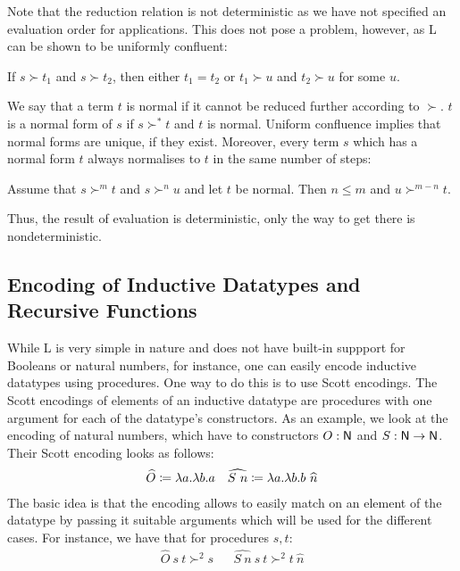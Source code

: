 Note that the reduction relation is not deterministic as we have not specified an evaluation order for applications. This does not pose a problem, however, as L can be shown to be uniformly confluent: 
\begin{fact}
  If $s \succ t_1$ and $s \succ t_2$, then either $t_1 = t_2$ or $t_1 \succ u$ and $t_2 \succ u$ for some $u$.
\end{fact}
We say that a term $t$ is normal if it cannot be reduced further according to $\succ$. $t$ is a normal form of $s$ if $s \succ^* t$ and $t$ is normal. 
Uniform confluence implies that normal forms are unique, if they exist. Moreover, every term $s$ which has a normal form $t$ always normalises to $t$ in the same number of steps: 
\begin{corollary}
  Assume that $s \succ^m t$ and $s \succ^n u$ and let $t$ be normal. Then $n \le m$ and $u \succ^{m - n} t$.
\end{corollary}
Thus, the result of evaluation is deterministic, only the way to get there is nondeterministic.

\subsection{Encoding of Inductive Datatypes and Recursive Functions}
While L is very simple in nature and does not have built-in suppport for Booleans or natural numbers, for instance, one can easily encode inductive datatypes using procedures. One way to do this is to use Scott encodings. 
The Scott encodings of elements of an inductive datatype are procedures with one argument for each of the datatype's constructors. 
As an example, we look at the encoding of natural numbers, which have to constructors $O : \mathsf{N}$ and $S : \mathsf{N} \rightarrow \mathsf{N}$.
Their Scott encoding looks as follows: 
\begin{align*}
  \widehat{O} \coloneqq \lambda a. \lambda b. a 
  && \widehat{S~n} \coloneqq \lambda a. \lambda b. b~\widehat{n}
\end{align*}
The basic idea is that the encoding allows to easily match on an element of the datatype by passing it suitable arguments which will be used for the different cases. 
For instance, we have that for procedures $s, t$: 
\begin{align*}
  \widehat{O}~s~t \succ^2 s && \widehat{S~n}~s~t \succ^2 t~\widehat{n} 
\end{align*}

